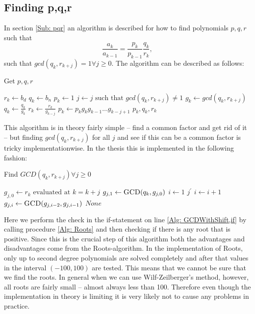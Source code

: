 \subsection{Finding p,q,r}
In section \ref{Sub: pqr} an algorithm is described for how to find polynomials $p,q,r$ such that
\begin{equation}\label{Eq: getpqr}
  \frac{a_k}{a_{k-1}} = \frac{p_k}{p_{k-1}}\frac{q_k}{r_k},
\end{equation}
such that $gcd(q_k,r_{k+j})=1 \forall j\geq 0$. The algorithm can be described as follows:
\begin{algorithm}[H]
  \caption{Get $p,q,r$}
  \begin{algorithmic}[1]
      \State $r_k\gets b_d$
      \State $q_k\gets b_n$
      \State $p_k\gets 1$
        \State $j\gets j \text{ such that } gcd(q_k,r_{k+j})\neq 1$
        \State $g_k\gets gcd(q_k,r_{k+j})$
        \State $q_k\gets \frac{q_k}{g_k}$
        \State $r_k\gets \frac{r_k}{g_{k-j}}$
        \State $p_k\gets p_kg_kg_{k-1}\ldots g_{k-j+1}$
      \EndWhile
      \State \Return $p_k,q_k,r_k$
    \EndProcedure
  \end{algorithmic}
\end{algorithm}
This algorithm is in theory fairly simple -- find a common factor and get rid of it -- but finding $gcd(q_k,r_{k+j})$ for all $j$ and see if this can be a common factor is tricky implementationwise. In the thesis this is implemented in the following fashion:
\begin{algorithm}[H]
  \caption{Find $GCD(q_k,r_{k+j})\forall j\geq 0$}
  \begin{algorithmic}[1]
      \State $g_{j,0}\gets r_k \text{ evaluated at } k=k+j$
      \State $g_{j,1}\gets \Call{GCD}{q_k,g_{j,0}}$
      \State $i\gets 1$
        \label{Alg: GCDWithShift,if}
          \State \Return $j^\prime$
        \EndIf
        \State $i\gets i+1$
        \State $g_{j,i}\gets \Call{GCD}{g_{j,i-2},g_{j,i-1}}$
      \EndWhile
      \State \Return $None$
    \EndProcedure
  \end{algorithmic}
\end{algorithm}
Here we perform the check in the if-statement on line \ref{Alg: GCDWithShift,if} by calling procedure \ref{Alg: Roots} and then checking if there is any root that is positive. Since this is the crucial step of this algorithm both the advantages and disadvantages come from the Roots-algorithm. In the implementation of Roots, only up to second degree polynomials are solved completely and after that values in the interval $(-100,100)$ are tested. This means that we cannot be sure that we find the roots. In general when we can use Wilf-Zeilberger's method, however, all roots are fairly small -- almost always less than 100. Therefore even though the implementation in theory is limiting it is very likely not to cause any problems in practice.
